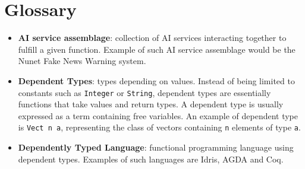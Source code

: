 \documentclass[]{report}
\begin{document}
\appendix
\chapter{Glossary}
\begin{itemize}
\item \textbf{AI service assemblage}: collection of AI services
  interacting together to fulfill a given function.  Example of such
  AI service assemblage would be the Nunet Fake News Warning system.
\item \textbf{Dependent Types}: types depending on values.  Instead of
  being limited to constants such as \texttt{Integer} or
  \texttt{String}, dependent types are essentially functions that take
  values and return types.  A dependent type is usually expressed as a
  term containing free variables.  An example of dependent type is
  \texttt{Vect n a}, representing the class of vectors containing
  \texttt{n} elements of type \texttt{a}.
\item \textbf{Dependently Typed Language}: functional programming
  language using dependent types.  Examples of such languages are
  Idris, AGDA and Coq.
\end{itemize}



\end{document}
